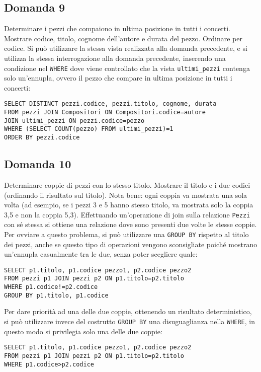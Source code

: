 \documentclass{article}
\numberwithin{equation}{subsection}
\begin{document}
\subsection*{Domanda 9}
Determinare i pezzi che compaiono in ultima posizione in tutti i concerti. Mostrare codice, titolo, cognome dell'autore e durata del pezzo. Ordinare per codice. Si può utilizzare la stessa vista realizzata 
alla domanda precedente, e si utilizza la stessa interrogazione alla domanda precedente, inserendo una condizione nel \verb|WHERE| dove viene controllato che la vista \verb|ultimi_pezzi| contenga solo un'ennupla, 
ovvero il pezzo che compare in ultima posizione in tutti i concerti:
\begin{verbatim}
SELECT DISTINCT pezzi.codice, pezzi.titolo, cognome, durata
FROM pezzi JOIN Compositori ON Compositori.codice=autore
JOIN ultimi_pezzi ON pezzi.codice=pezzo
WHERE (SELECT COUNT(pezzo) FROM ultimi_pezzi)=1
ORDER BY pezzi.codice
\end{verbatim}

\subsection*{Domanda 10}
Determinare coppie di pezzi con lo stesso titolo. Mostrare il titolo e i due codici (ordinando il risultato sul titolo). Nota bene: ogni coppia va mostrata una sola volta 
(ad esempio, se i pezzi 3 e 5 hanno stesso titolo, va mostrata solo la coppia 3,5 e non la coppia 5,3). Effettuando un'operazione di join sulla relazione \verb|Pezzi| con sé stessa si ottiene una relazione dove sono 
presenti due volte le stesse coppie. Per ovviare a questo problema, si può utilizzare una \verb|GROUP BY| rispetto al titolo dei pezzi, anche se questo tipo di operazioni vengono sconsigliate poiché mostrano 
un'ennupla casualmente tra le due, senza poter scegliere quale:
\begin{verbatim}
SELECT p1.titolo, p1.codice pezzo1, p2.codice pezzo2
FROM pezzi p1 JOIN pezzi p2 ON p1.titolo=p2.titolo
WHERE p1.codice!=p2.codice
GROUP BY p1.titolo, p1.codice
\end{verbatim}

Per dare priorità ad una delle due coppie, ottenendo un risultato deterministico, si può utilizzare invece del costrutto \verb|GROUP BY| una 
disuguaglianza nella \verb|WHERE|, in questo modo si privilegia solo una delle due coppie:
\begin{verbatim}
SELECT p1.titolo, p1.codice pezzo1, p2.codice pezzo2
FROM pezzi p1 JOIN pezzi p2 ON p1.titolo=p2.titolo
WHERE p1.codice>p2.codice
\end{verbatim}
    
\end{document}
